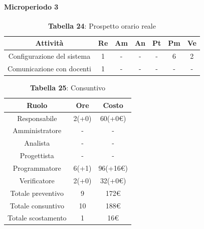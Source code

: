 \paragraph{Microperiodo 3}
\begin{table}[H]
	\centering
	\begin{tabular}{|c|c|c|c|c|c|c|}
		\hline
		\rowcolor{lighter-grayer}
		\textbf{Attività} & \textbf{Re}        & \textbf{Am}        & \textbf{An}        & \textbf{Pt}        & \textbf{Pm}        & \textbf{Ve}        \\ \hline
		
		Configurazione del sistema & 1 & - & - & - & 6 & 2 \\ \hline
		Comunicazione con docenti & 1 & - & - & - & - & - \\ \hline	
		
	\end{tabular}
	\caption*{\textbf{Tabella 24}: Prospetto orario reale\\}
\end{table}

\begin{table}[H]
	\centering
	\renewcommand{\arraystretch}{1.5}
	\begin{tabular}{|c|c|c|}
		\hline
		\rowcolor{lighter-grayer}
		Ruolo & Ore & Costo \\ \hline
		Responsabile & 2(+0) & 60(+0\euro) \\ \hline
		Amministratore & - & - \\ \hline
		Analista & - & - \\ \hline
		Progettista & - & - \\ \hline
		Programmatore & 6(+1) & 96(+16\euro) \\ \hline
		Verificatore & 2(+0) & 32(+0\euro) \\ \hline
		Totale preventivo & 9 & 172\euro \\ \hline
		Totale consuntivo & 10 & 188\euro \\ \hline
		Totale scostamento & 1 & 16\euro \\ \hline
	\end{tabular}
	\caption*{\textbf{Tabella 25}: Consuntivo\\}
\end{table}

